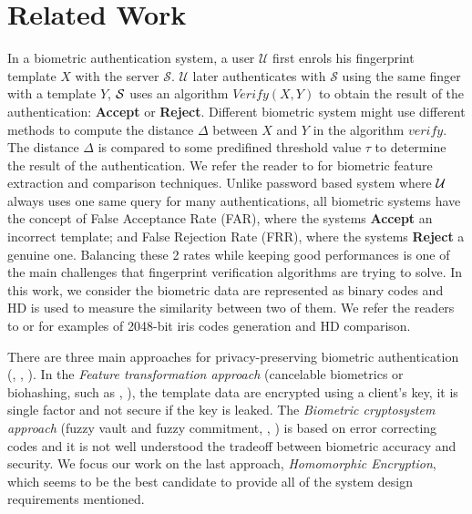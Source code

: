 \section{Related Work}
\label{sec:iscRelatedWor}
In a biometric authentication system, a user $\mathcal{U}$ first enrols his fingerprint template $X$ with the server
$\mathcal{S}$. $\mathcal{U}$ later authenticates with $\mathcal{S}$ using the same finger with a template $Y$, $\mathcal{S}$
uses an algorithm $Verify(X,Y)$ to obtain the result of the authentication: \textbf{Accept} or
\textbf{Reject}. Different biometric system might use different methods to compute the distance $\Delta$ between $X$ and
$Y$ in the algorithm $verify$. The distance $\Delta$ is compared to some predifined threshold value $\tau$ to determine
the result of the authentication. We refer the reader to \cite{jain2007handbook} for biometric feature extraction and
comparison techniques. Unlike password based system where $\mathcal{U}$ always uses one same query for many authentications,
all biometric systems have the concept of False Acceptance Rate (FAR), where the systems \textbf{Accept} an incorrect
template; and False Rejection Rate (FRR), where the systems \textbf{Reject} a genuine one.  Balancing these 2 rates
while keeping good performances is one of the main challenges that fingerprint verification algorithms
\cite{FVConGoi2:online} are trying to solve. In this work, we consider the biometric data are represented as binary
codes and HD is used to measure the similarity between two of them. We refer the readers to \cite{daugman2003importance}
or \cite{FujitsuD7:online} for examples of 2048-bit iris codes generation and HD comparison.

There are three main approaches for privacy-preserving biometric authentication (\cite{jain201650},
\cite{belguechi2011overview}, \cite{jain2008biometric}). In the \emph{Feature transformation approach} (cancelable
biometrics or biohashing, such as \cite{teoh2008cancellable}, \cite{cappelli2010minutia}), the template data are
encrypted using a client's key, it is single factor and not secure if the key is leaked. The \emph{Biometric
  cryptosystem approach} (fuzzy vault and fuzzy commitment, \cite{uludag2004biometric}, \cite{nagar2010hybrid}) is based
on error correcting codes and it is not well understood the tradeoff between biometric accuracy and security. We focus
our work on the last approach, \emph{Homomorphic Encryption}, which seems to be the best candidate to provide all of the
system design requirements mentioned.

